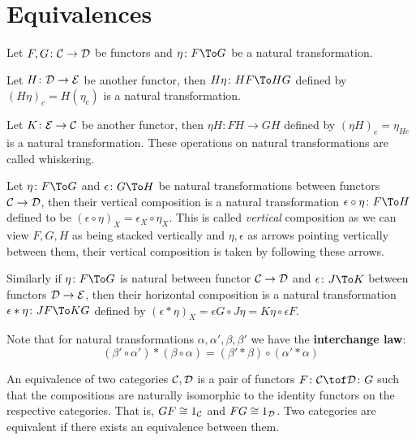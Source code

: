 \section{Equivalences}

\bdefn

    Let $F,G\colon{{\cal C}}\to{{\cal D}}$ be functors and $\eta\colon F\To G$ be a natural transformation.
    \benum
        \item Let $H\colon{{\cal D}}\to{{\cal E}}$ be another functor, then $H\eta\colon HF\To HG$ defined by $(H\eta)_c=H(\eta_c)$ is a natural transformation.
        \item Let $K\colon{{\cal E}}\to{{\cal C}}$ be another functor, then $\eta H\colon FH\to GH$ defined by $(\eta H)_e=\eta_{Hc}$ is a natural transformation.
    \eenum
    These operations on natural transformations are called {\emphcolor whiskering}.

\edefn

\bdefn

    Let $\eta\colon F\To G$ and $\epsilon\colon G\To H$ be natural transformations between functors ${{\cal C}}\to{{\cal D}}$, then their {\emphcolor vertical composition} is a natural
    transformation $\epsilon\circ\eta\colon F\To H$ defined to be $(\epsilon\circ\eta)_X=\epsilon_X\circ\eta_X$.
    This is called {\it vertical\/} composition as we can view $F,G,H$ as being stacked vertically and $\eta,\epsilon$ as arrows pointing vertically between them, their vertical
    composition is taken by following these arrows.

    Similarly if $\eta\colon F\To G$ is natural between functor ${{\cal C}}\to{{\cal D}}$ and $\epsilon\colon J\To K$ between functors ${{\cal D}}\to{{\cal E}}$, then their {\emphcolor horizontal composition}
    is a natural transformation $\epsilon*\eta\colon JF\To KG$ defined by $(\epsilon*\eta)_X=\epsilon G\circ J\eta=K\eta\circ\epsilon F$.

\edefn

Note that for natural transformations $\alpha,\alpha',\beta,\beta'$ we have the {\bf interchange law}:
$$ (\beta'\circ\alpha')*(\beta\circ\alpha) = (\beta'*\beta)\circ(\alpha'*\alpha) $$

\bdefn

    An {\emphcolor equivalence} of two categories ${{\cal C}},{{\cal D}}$ is a pair of functors $F\colon\C\tof\D\colon G$ such that the compositions are naturally isomorphic to the identity functors on the
    respective categories.
    That is, $GF\cong1_{{\cal C}}$ and $FG\cong1_{{\cal D}}$.
    Two categories are {\emphcolor equivalent} if there exists an equivalence between them.

